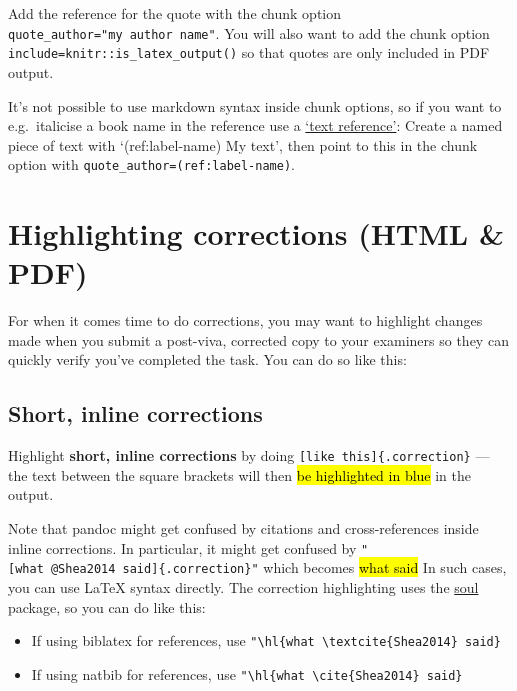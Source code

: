 \documentclass[a4paper, twoside]{templates/ociamthesis}
\providecommand{\tightlist}{%
  \setlength{\itemsep}{0pt}\setlength{\parskip}{0pt}}
\begin{document}
Add the reference for the quote with the chunk option \texttt{quote\_author="my\ author\ name"}.
You will also want to add the chunk option \texttt{include=knitr::is\_latex\_output()} so that quotes are only included in PDF output.

It's not possible to use markdown syntax inside chunk options, so if you want to e.g.~italicise a book name in the reference use a \href{https://bookdown.org/yihui/bookdown/markdown-extensions-by-bookdown.html\#text-references}{`text reference'}: Create a named piece of text with `(ref:label-name) My text', then point to this in the chunk option with \texttt{quote\_author=\textquotesingle{}(ref:label-name)\textquotesingle{}}.

\hypertarget{highlighting-corrections-html-pdf}{%
\section{Highlighting corrections (HTML \& PDF)}\label{highlighting-corrections-html-pdf}}

For when it comes time to do corrections, you may want to highlight changes made when you submit a post-viva, corrected copy to your examiners so they can quickly verify you've completed the task.
You can do so like this:

\hypertarget{short-inline-corrections}{%
\subsection{Short, inline corrections}\label{short-inline-corrections}}

Highlight \textbf{short, inline corrections} by doing \texttt{{[}like\ this{]}\{.correction\}} --- the text between the square brackets will then \hl{be highlighted in blue} in the output.

Note that pandoc might get confused by citations and cross-references inside inline corrections.
In particular, it might get confused by \texttt{"{[}what\ @Shea2014\ said{]}\{.correction\}"} which becomes \hl{what \textcite{Shea2014} said}
In such cases, you can use LaTeX syntax directly.
The correction highlighting uses the \href{https://ctan.org/pkg/soul}{soul} package, so you can do like this:

\begin{itemize}
\tightlist
\item
  If using biblatex for references, use \texttt{"\textbackslash{}hl\{what\ \textbackslash{}textcite\{Shea2014\}\ said\}}
\item
  If using natbib for references, use \texttt{"\textbackslash{}hl\{what\ \textbackslash{}cite\{Shea2014\}\ said\}}
\end{itemize}
\end{document}
